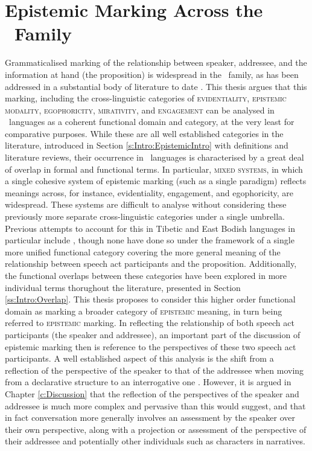 \section{Epistemic Marking Across the \lfam\ Family}\label{s:Intro:Thesis}
Grammaticalised marking of the relationship between speaker, addressee, and the information at hand (the proposition) is widespread in the \lfam\ family, as has been addressed in a substantial body of literature to date \cites{Aikhenvald2004}{Hill2017}. This thesis argues that this marking, including the cross-linguistic categories of \textsc{evidentiality}, \textsc{epistemic modality}, \textsc{egophoricity}, \textsc{mirativity}, and \textsc{engagement} can be analysed in \lfam\ languages as a coherent functional domain and category, at the very least for comparative purposes. While these are all well established categories in the literature, introduced in Section \ref{s:Intro:EpistemicIntro} with definitions and literature reviews, their occurrence in \lfam\ languages is characterised by a great deal of overlap in formal and functional terms. In particular, \textsc{mixed systems}, in which a single cohesive system of epistemic marking (such as a single paradigm) reflects meanings across, for instance, evidentiality, engagement, and egophoricity, are widespread. These systems are difficult to analyse without considering these previously more separate cross-linguistic categories under a single umbrella. Previous attempts to account for this in Tibetic and East Bodish languages in particular include , though none have done so under the framework of a single more unified functional category covering the more general meaning of the relationship between speech act participants and the proposition. Additionally, the functional overlaps between these categories have been explored in more individual terms thorughout the literature, presented in Section \ref{ss:Intro:Overlap}. This thesis proposes to consider this higher order functional domain as marking a broader category of \textsc{epistemic} meaning, in turn being referred to \textsc{epistemic} marking. In reflecting the relationship of both speech act participants (the speaker and addressee), an important part of the discussion of epistemic marking then is reference to the perspectives of these two speech act participants. A well established aspect of this analysis is the shift from a reflection of the perspective of the speaker to that of the addressee when moving from a declarative structure to an interrogative one \cite{Hill2020}. However, it is argued in Chapter \ref{c:Discussion} that the reflection of the perspectives of the speaker and addressee is much more complex and pervasive than this would suggest, and that in fact conversation more generally involves an assessment by the speaker over their own perspective, along with a projection or assessment of the perspective of their addressee and potentially other individuals such as characters in narratives. 

